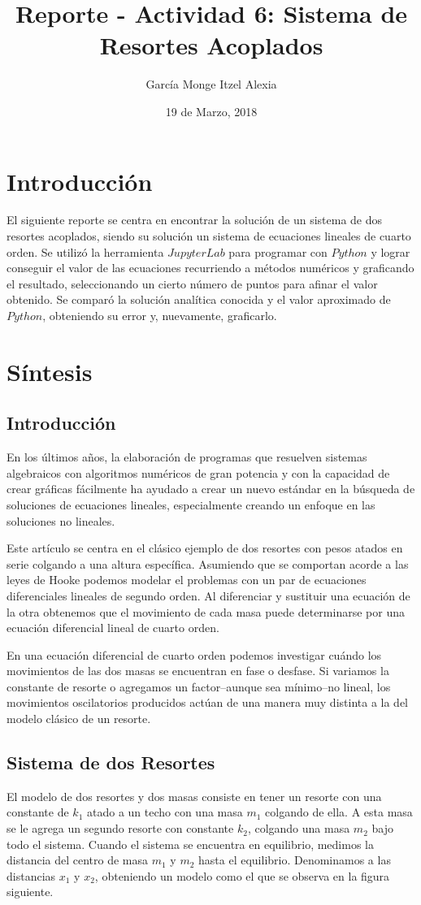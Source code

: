 \documentclass{article}
\title{Reporte - Actividad 6: Sistema de Resortes Acoplados}
\author{García Monge Itzel Alexia}
\date{19 de Marzo, 2018}
\begin{document}
\maketitle
\section{Introducción}
El siguiente reporte se centra en encontrar la solución de un sistema de dos resortes acoplados, siendo su solución un sistema de ecuaciones lineales de cuarto orden. Se utilizó la herramienta $Jupyter Lab$ para programar con $Python$ y lograr conseguir el valor de las ecuaciones recurriendo a métodos numéricos y graficando el resultado, seleccionando un cierto número de puntos para afinar el valor obtenido. Se comparó la solución analítica conocida y el valor aproximado de $Python$, obteniendo su error y, nuevamente, graficarlo.

\section{Síntesis}
\subsection{Introducción}
En los últimos años, la elaboración de programas que resuelven sistemas algebraicos con algoritmos numéricos de gran potencia y con la capacidad de crear gráficas fácilmente ha ayudado a crear un nuevo estándar en la búsqueda de soluciones de ecuaciones lineales, especialmente creando un enfoque en las soluciones no lineales.

Este artículo se centra en el clásico ejemplo de dos resortes con pesos atados en serie colgando a una altura específica. Asumiendo que se comportan acorde a las leyes de Hooke podemos modelar el problemas con un par de ecuaciones diferenciales lineales de segundo orden. Al diferenciar y sustituir una ecuación de la otra obtenemos que el movimiento de cada masa puede determinarse por una ecuación diferencial lineal de cuarto orden.

En una ecuación diferencial de cuarto orden podemos investigar cuándo los movimientos de las dos masas se encuentran en fase o desfase. Si variamos la constante de resorte o agregamos un factor--aunque sea mínimo--no lineal, los movimientos oscilatorios producidos actúan de una manera muy distinta a la del modelo clásico de un resorte. 

\subsection{Sistema de dos Resortes}
El modelo de dos resortes y dos masas consiste en tener un resorte con una constante de $k_1$ atado a un techo con una masa $m_1$ colgando de ella. A esta masa se le agrega un segundo resorte con constante $k_2$, colgando una masa $m_2$ bajo todo el sistema. Cuando el sistema se encuentra en equilibrio, medimos la distancia del centro de masa $m_1$ y $m_2$ hasta el equilibrio. Denominamos a las distancias $x_1$ y $x_2$, obteniendo un modelo como el que se observa en la figura siguiente.
\end{document}
